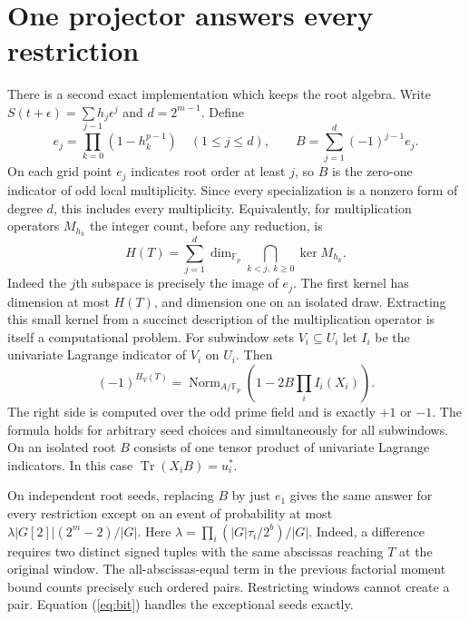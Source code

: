 \documentclass[11pt]{article}
\newcommand{\F}{\mathbb F}
\newcommand{\Nm}{\operatorname{Norm}}
\newcommand{\Tr}{\operatorname{Tr}}
\begin{document}
\section{One projector answers every restriction}
There is a second exact implementation which keeps the root algebra.
Write $S(t+\epsilon)=\sum h_j\epsilon^j$ and $d=2^{m-1}$. Define
\[
  e_j=\prod_{k=0}^{j-1}(1-h_k^{p-1})\quad(1\le j\le d),\qquad
  B=\sum_{j=1}^d(-1)^{j-1}e_j .
\]
On each grid point $e_j$ indicates root order at least $j$, so $B$
is the zero-one indicator of odd local multiplicity. Since every
specialization is a nonzero form of degree $d$, this includes every
multiplicity. Equivalently, for multiplication operators $M_{h_k}$
the integer count, before any reduction, is
\[
 H(T)=\sum_{j=1}^{d}\dim_{\F_p}\bigcap_{k<j,\ k\ge0}\ker M_{h_k}.
\]
Indeed the $j$th subspace is precisely the image of $e_j$. The first
kernel has dimension at most $H(T)$, and dimension one on an isolated
draw. Extracting this small kernel from a succinct description of
the multiplication operator is itself a computational problem.
For subwindow sets $V_i\subseteq U_i$ let $I_i$ be
the univariate Lagrange indicator of $V_i$ on $U_i$. Then
\begin{equation}
   (-1)^{H_V(T)}
   =\Nm_{A/\F_p}\left(1-2B\prod_i I_i(X_i)\right). \label{eq:bit}
\end{equation}
The right side is computed over the odd prime field and is exactly
$+1$ or $-1$. The formula holds for arbitrary seed choices and
simultaneously for all subwindows. On an isolated root $B$ consists
of one tensor product of univariate Lagrange indicators. In this
case $\Tr(X_iB)=u_i^*$.

On independent root seeds, replacing $B$ by just $e_1$ gives the
same answer for every restriction except on an event of probability
at most $\lambda |G[2]|(2^m-2)/|G|$. Here $\lambda=\prod_i
(|G|\tau_i/2^b)/|G|$. Indeed, a difference requires two distinct
signed tuples with the same abscissas reaching $T$ at the original
window. The all-abscissas-equal term in the previous factorial
moment bound counts precisely such ordered pairs. Restricting
windows cannot create a pair. Equation (\ref{eq:bit}) handles the
exceptional seeds exactly.
\end{document}

